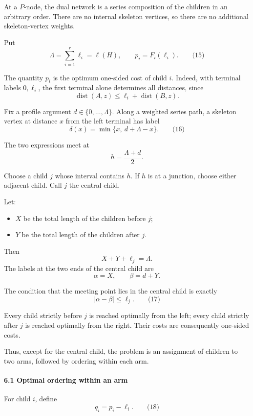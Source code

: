 \documentclass[
  11pt,
  a4paper,
]{article}
\providecommand{\tightlist}{%
  \setlength{\itemsep}{0pt}\setlength{\parskip}{0pt}}
\begin{document}
At a \(P\)-node, the dual network is a series composition of the
children in an arbitrary order. There are no internal skeleton vertices,
so there are no additional skeleton-vertex weights.

Put \[
\Lambda=\sum_{i=1}^{r}\ell_i=\ell(H),
\qquad
p_i=F_i(\ell_i).
\qquad\text{(15)}
\]

The quantity \(p_i\) is the optimum one-sided cost of child \(i\).
Indeed, with terminal labels \(0,\ell_i\), the first terminal alone
determines all distances, since \[
\operatorname{dist}(A,z)
\le
\ell_i+\operatorname{dist}(B,z).
\]

Fix a profile argument \(d\in\{0,\ldots,\Lambda\}\). Along a weighted
series path, a skeleton vertex at distance \(x\) from the left terminal
has label \[
\delta(x)=\min\{x,\ d+\Lambda-x\}.
\qquad\text{(16)}
\]

The two expressions meet at \[
h=\frac{\Lambda+d}{2}.
\]

Choose a child \(j\) whose interval contains \(h\). If \(h\) is at a
junction, choose either adjacent child. Call \(j\) the central child.

Let:

\begin{itemize}
\tightlist
\item
  \(X\) be the total length of the children before \(j\);
\item
  \(Y\) be the total length of the children after \(j\).
\end{itemize}

Then \[
X+Y+\ell_j=\Lambda.
\] The labels at the two ends of the central child are \[
\alpha=X,\qquad \beta=d+Y.
\]

The condition that the meeting point lies in the central child is
exactly \[
|\alpha-\beta|\le \ell_j.
\qquad\text{(17)}
\]

Every child strictly before \(j\) is reached optimally from the left;
every child strictly after \(j\) is reached optimally from the right.
Their costs are consequently one-sided costs.

Thus, except for the central child, the problem is an assignment of
children to two arms, followed by ordering within each arm.

\paragraph{6.1 Optimal ordering within an
arm}\label{optimal-ordering-within-an-arm}

For child \(i\), define \[
q_i=p_i-\ell_i.
\qquad\text{(18)}
\]
\end{document}
